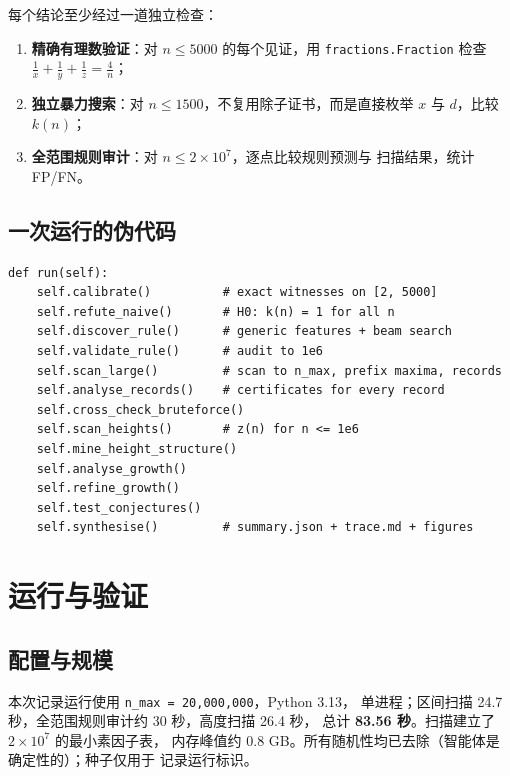 \documentclass[11pt,a4paper]{ctexart}
\theoremstyle{definition}
\theoremstyle{remark}
\begin{document}
每个结论至少经过一道独立检查：
\begin{enumerate}
\item \textbf{精确有理数验证}：对 $n\le5000$ 的每个见证，用
\texttt{fractions.Fraction} 检查 $\frac1x+\frac1y+\frac1z=\frac4n$；
\item \textbf{独立暴力搜索}：对 $n\le1500$，不复用除子证书，而是直接枚举
$x$ 与 $d$，比较 $k(n)$；
\item \textbf{全范围规则审计}：对 $n\le2\times10^7$，逐点比较规则预测与
扫描结果，统计 FP/FN。
\end{enumerate}

\subsection{一次运行的伪代码}

\begin{lstlisting}[caption={智能体主循环（简化）},label={lst:loop}]
def run(self):
    self.calibrate()          # exact witnesses on [2, 5000]
    self.refute_naive()       # H0: k(n) = 1 for all n
    self.discover_rule()      # generic features + beam search
    self.validate_rule()      # audit to 1e6
    self.scan_large()         # scan to n_max, prefix maxima, records
    self.analyse_records()    # certificates for every record
    self.cross_check_bruteforce()
    self.scan_heights()       # z(n) for n <= 1e6
    self.mine_height_structure()
    self.analyse_growth()
    self.refine_growth()
    self.test_conjectures()
    self.synthesise()         # summary.json + trace.md + figures
\end{lstlisting}

\section{运行与验证}

\subsection{配置与规模}

本次记录运行使用 \texttt{n\_max = 20{,}000{,}000}，Python 3.13，
单进程；区间扫描 24.7 秒，全范围规则审计约 30 秒，高度扫描 26.4 秒，
总计 \textbf{83.56 秒}。扫描建立了 $2\times10^7$ 的最小素因子表，
内存峰值约 0.8 GB。所有随机性均已去除（智能体是确定性的）；种子仅用于
记录运行标识。
\end{document}
